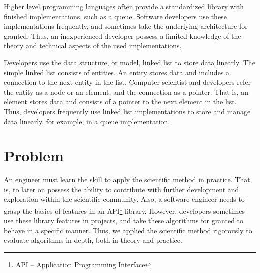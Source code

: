 \documentclass[a4paper,11pt]{kth-mag}
\newcommand*{\skippara}{\par\vspace{\baselineskip} \noindent}
\begin{document}
\skippara Higher level programming languages often provide a standardized library with finished implementations, such as a queue.
Software developers use these implementations frequently, and sometimes take the underlying architecture for granted.
Thus, an inexperienced developer possess a limited knowledge of the theory and technical aspects of the used implementations.

\skippara Developers use the data structure, or model, linked list to store data linearly.
The simple linked list consists of entities.
An entity stores data and includes a connection to the next entity in the list.
Computer scientist and developers refer the entity as a node or an element, and the connection as a pointer.
That is, an element stores data and consists of a pointer to the next element in the list.
Thus, developers frequently use linked list implementations to store and manage data linearly, for example, in a queue implementation.


\section{Problem}\label{sec:problem}
An engineer must learn the skill to apply the scientific method in practice.
That is, to later on possess the ability to contribute with further development and exploration within the scientific community.
Also, a software engineer needs to grasp the basics of features in an API\footnote{API -- Application Programming Interface}-library.
However, developers sometimes use these library features in projects, and take these algorithms for granted to behave in a specific manner.
Thus, we applied the scientific method rigorously to evaluate algorithms in depth, both in theory and practice.
\end{document}

